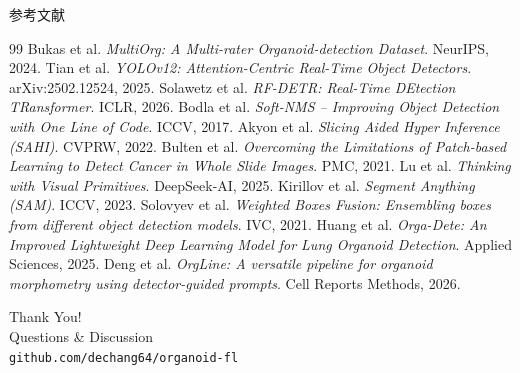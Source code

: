 \documentclass[aspectratio=169, 10pt]{beamer}
\begin{document}
\begin{frame}[allowframebreaks]{参考文献}
  \footnotesize
  \begin{thebibliography}{99}
     Bukas et al. \textit{MultiOrg: A Multi-rater Organoid-detection Dataset}. NeurIPS, 2024.
     Tian et al. \textit{YOLOv12: Attention-Centric Real-Time Object Detectors}. arXiv:2502.12524, 2025.
     Solawetz et al. \textit{RF-DETR: Real-Time DEtection TRansformer}. ICLR, 2026.
     Bodla et al. \textit{Soft-NMS -- Improving Object Detection with One Line of Code}. ICCV, 2017.
     Akyon et al. \textit{Slicing Aided Hyper Inference (SAHI)}. CVPRW, 2022.
     Bulten et al. \textit{Overcoming the Limitations of Patch-based Learning to Detect Cancer in Whole Slide Images}. PMC, 2021.
     Lu et al. \textit{Thinking with Visual Primitives}. DeepSeek-AI, 2025.
     Kirillov et al. \textit{Segment Anything (SAM)}. ICCV, 2023.
     Solovyev et al. \textit{Weighted Boxes Fusion: Ensembling boxes from different object detection models}. IVC, 2021.
     Huang et al. \textit{Orga-Dete: An Improved Lightweight Deep Learning Model for Lung Organoid Detection}. Applied Sciences, 2025.
     Deng et al. \textit{OrgLine: A versatile pipeline for organoid morphometry using detector-guided prompts}. Cell Reports Methods, 2026.
  \end{thebibliography}
\end{frame}

\begin{frame}[plain]
  \centering
  \vfill
  \Large\textcolor{myblue}{Thank You!}\\[0.8em]
  \normalsize Questions \& Discussion\\[1.5em]
  \footnotesize\texttt{github.com/dechang64/organoid-fl}
  \vfill
\end{frame}
\end{document}
